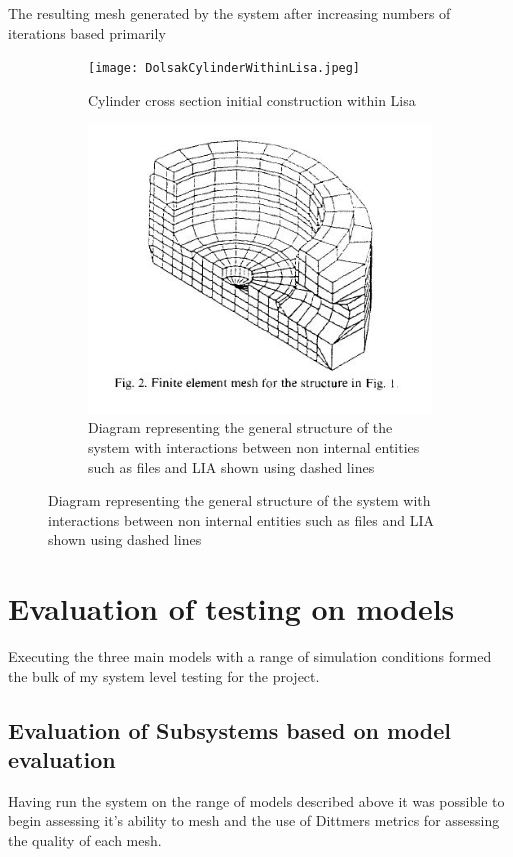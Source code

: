 \documentclass{article}
\begin{document}
The resulting mesh generated by the system after increasing numbers of iterations based primarily

\begin{figure}
\centering
\begin{subfigure}{.5\textwidth}
  \centering
  \texttt{[image: DolsakCylinderWithinLisa.jpeg]}
  \caption{Cylinder cross section initial construction within Lisa \cite{DolsakPaper91}}
  \label{fig:sub1}
\end{subfigure}%
\begin{subfigure}{.5\textwidth}
  \centering
  \includegraphics[width=0.9\linewidth]{DolsakCylinderMeshed.jpeg}
  \caption{Diagram representing the general structure of the system with interactions between non internal entities such as files and LIA shown using dashed lines}
  \label{fig:sub2}
\end{subfigure}
\label{fig:test}
\end{figure}




\newpage

\section{Evaluation of testing on models}
Executing the three main models with a range of simulation conditions formed the bulk of my system level testing for the project.




\subsection{Evaluation of Subsystems based on model evaluation}
Having run the system on the range of models described above it was possible to begin assessing it's ability to mesh and the use of Dittmers metrics for assessing 
the quality of each mesh.
\end{document}
